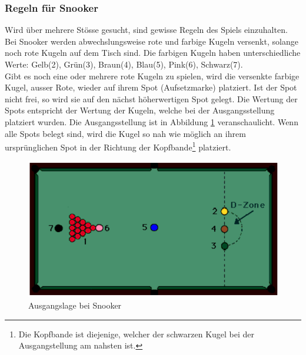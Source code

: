 \subsubsection{Regeln für Snooker}
Wird über mehrere Stösse gesucht, sind gewisse Regeln des Spiels einzuhalten. Bei Snooker werden abwechslungsweise rote
und farbige Kugeln versenkt, solange noch rote Kugeln auf dem Tisch sind. Die farbigen Kugeln haben unterschiedliche
Werte: Gelb(2), Grün(3), Braun(4), Blau(5), Pink(6), Schwarz(7)\cite{stoppball:spielregel:snooker}.\\
Gibt es noch eine oder mehrere rote Kugeln zu spielen, wird die versenkte farbige Kugel, ausser Rote, wieder
auf ihrem Spot (Aufsetzmarke) platziert. Ist der Spot nicht frei, so wird sie auf den nächst höherwertigen Spot gelegt. Die Wertung
der Spots entspricht der Wertung der Kugeln, welche bei der Ausgangsstellung platziert wurden. Die Ausgangsstellung ist in
Abbildung \ref{fig:snooker_ausgangslage} veranschaulicht. Wenn alle Spots belegt sind, wird die Kugel so nah wie möglich an ihrem ursprünglichen
Spot in der Richtung der Kopfbande\footnote{Die Kopfbande ist diejenige, welcher der schwarzen Kugel bei der Ausgangstellung am
nahsten ist.} platziert\cite{stoppball:spielregel:snooker}.

\begin{figure}[h!]
    \begin{center}
        \includegraphics[width=0.4\linewidth]{../common/03_billiard_ai/resources/39_snooker_ausgangslage.png}
    \end{center}
    \caption{Ausgangslage bei Snooker\cite{stoppball:spielregel:snooker}}
    \label{fig:snooker_ausgangslage}
\end{figure}

